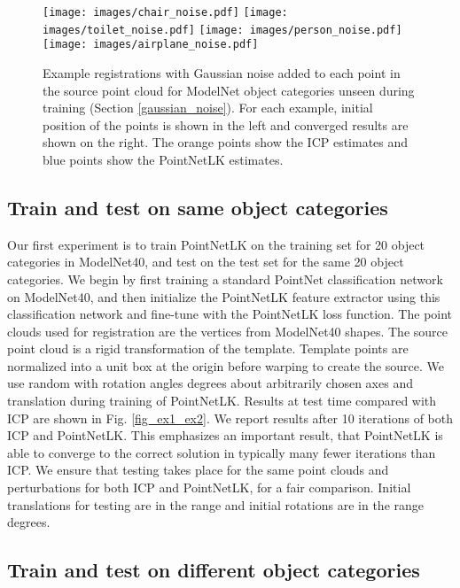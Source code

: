 \documentclass[10pt,twocolumn,letterpaper]{article}
\begin{document}
\begin{figure*}[h!]
\centering
   \texttt{[image: images/chair\_noise.pdf]}\hspace{20mm}
  \texttt{[image: images/toilet\_noise.pdf]}
  \texttt{[image: images/person\_noise.pdf]}\hspace{10mm}
  \texttt{[image: images/airplane\_noise.pdf]}
\caption{Example registrations with Gaussian noise added to each point in the source point cloud for ModelNet object categories unseen during training (Section \ref{gaussian_noise}). For each example, initial position of the points is shown in the left and converged results are shown on the right. The orange points show the ICP estimates and blue points show the PointNetLK estimates.}
\label{fig_gaussiannoise}
\end{figure*}
\subsection{Train and test on same object categories} \label{train_test_same_object_category}

Our first experiment is to train PointNetLK on the training set for 20 object categories in ModelNet40, and test on the test set for the same 20 object categories. We begin by first training a standard PointNet classification network on ModelNet40, and then initialize the PointNetLK feature extractor  using this classification network and fine-tune with the PointNetLK loss function. The point clouds used for registration are the vertices from ModelNet40 shapes. The source point cloud is a rigid transformation of the template. Template points are normalized into a unit box at the origin  before warping to create the source. We use random  with rotation angles  degrees about arbitrarily chosen axes and translation  during training of PointNetLK. Results at test time compared with ICP are shown in Fig. \ref{fig_ex1_ex2}. We report results after 10 iterations of both ICP and PointNetLK. This emphasizes an important result, that PointNetLK is able to converge to the correct solution in typically many fewer iterations than ICP. We ensure that testing takes place for the same point clouds and perturbations for both ICP and PointNetLK, for a fair comparison. Initial translations for testing are in the range  and initial rotations are in the range  degrees.

\subsection{Train and test on different object categories} \label{train_test_different_category}
\end{document}
